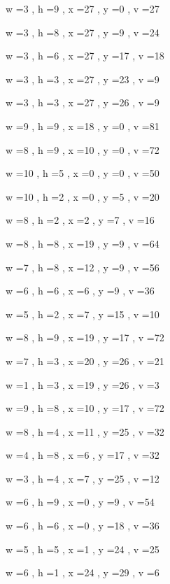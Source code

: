 \documentclass[11pt]{article}
\begin{document}


w =3 , h =9 , x =27 , y =0 , v =27
\par
w =3 , h =8 , x =27 , y =9 , v =24
\par
w =3 , h =6 , x =27 , y =17 , v =18
\par
w =3 , h =3 , x =27 , y =23 , v =9
\par
w =3 , h =3 , x =27 , y =26 , v =9
\par
w =9 , h =9 , x =18 , y =0 , v =81
\par
w =8 , h =9 , x =10 , y =0 , v =72
\par
w =10 , h =5 , x =0 , y =0 , v =50
\par
w =10 , h =2 , x =0 , y =5 , v =20
\par
w =8 , h =2 , x =2 , y =7 , v =16
\par
w =8 , h =8 , x =19 , y =9 , v =64
\par
w =7 , h =8 , x =12 , y =9 , v =56
\par
w =6 , h =6 , x =6 , y =9 , v =36
\par
w =5 , h =2 , x =7 , y =15 , v =10
\par
w =8 , h =9 , x =19 , y =17 , v =72
\par
w =7 , h =3 , x =20 , y =26 , v =21
\par
w =1 , h =3 , x =19 , y =26 , v =3
\par
w =9 , h =8 , x =10 , y =17 , v =72
\par
w =8 , h =4 , x =11 , y =25 , v =32
\par
w =4 , h =8 , x =6 , y =17 , v =32
\par
w =3 , h =4 , x =7 , y =25 , v =12
\par
w =6 , h =9 , x =0 , y =9 , v =54
\par
w =6 , h =6 , x =0 , y =18 , v =36
\par
w =5 , h =5 , x =1 , y =24 , v =25
\par
w =6 , h =1 , x =24 , y =29 , v =6
\par
\newpage
\end{document}
